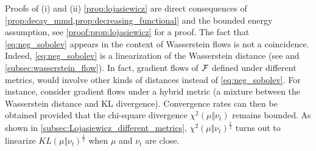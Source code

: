 Proofs of (i) and (ii) \cref{prop:lojasiewicz} are direct consequences of \cref{prop:decay_mmd,prop:decreasing_functional} and the bounded energy assumption, see  \cref{proof:prop:lojasiewicz} for a proof. The fact that \cref{eq:neg_sobolev} appears in the context of Wasserstein flows is not a coincidence. Indeed, \cref{eq:neg_sobolev} is a linearization of the Wasserstein distance (see \cite{Peyre:2011,Otto:2000} and \cref{subsec:wasserstein_flow}). In fact, gradient flows of ${{\mathcal F}}$ defined under different metrics, would involve other kinds of distances instead of \cref{eq:neg_sobolev}. 
For instance, \cite{rotskoff2019global} consider gradient flows under a hybrid metric (a mixture between the Wasserstein distance and KL divergence). Convergence rates can then be obtained provided that the chi-square divergence $\chi^2(\mu\Vert \nu_t)$ remains bounded. As shown in \cref{subsec:Lojasiewicz_different_metrics}, $\chi^2(\mu\Vert \nu_t)^{\frac{1}{2}}$ turns out to linearize $KL(\mu\Vert \nu_t)^{\frac{1}{2}}$ when $\mu$ and $\nu_t$ are close. 

